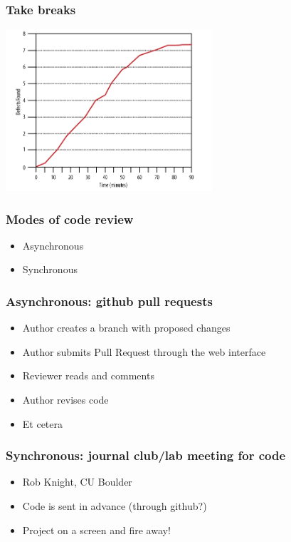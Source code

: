 \documentclass{beamer}
\begin{document}
\begin{frame}
\frametitle{Take breaks}
\includegraphics[height=6cm]{figures/review_errors}
\end{frame}


\begin{frame}
\frametitle{Modes of code review}
\begin{itemize}
\pause
\item
Asynchronous 
\pause
\item
Synchronous 
\end{itemize}
\end{frame}

\begin{frame}
\frametitle{Asynchronous: github pull requests}
\begin{itemize}
\pause
\item
Author creates a branch with proposed changes 
\pause
\item
Author submits Pull Request through the web interface
\pause
\item
Reviewer reads and comments
\pause
\item
Author revises code
\pause
\item
Et cetera
\end{itemize}
\end{frame}

\begin{frame}
\frametitle{Synchronous: journal club/lab meeting for code}
\begin{itemize}
\pause
\item
Rob Knight, CU Boulder \footnotemark[1]
\pause
\item
Code is sent in advance (through github?)
\pause
\item 
Project on a screen and fire away!
\end{itemize}
\end{frame}
\end{document}
